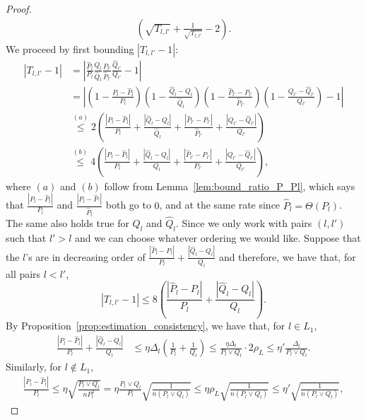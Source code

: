 \documentclass{article}
\begin{document}
\begin{proof}
\begin{align}
    \left( \sqrt{T_{l,l'}} + \frac{1}{\sqrt{T_{l,l'}}} - 2 \right). \label{eqn:Ihat_Istar2}
\end{align}
We proceed by first bounding $|T_{l,l'} - 1|$:
\begin{align*}
|T_{l,l'} - 1| &= \left| \frac{\hat{P}_l}{P_l} \frac{Q_l}{\hat{Q}_l} 
      \frac{P_{l'}}{\hat{P}_{l'}} \frac{\hat{Q}_{l'}}{Q_{l'}} - 1 \right| \\
 &= \left| \left( 1 - \frac{P_l - \hat{P}_l}{P_l} \right)
    \left( 1 - \frac{\hat{Q}_l - Q_l}{\hat{Q}_l} \right)
   \left( 1- \frac{\hat{P}_{l'} - P_{l'}}{\hat{P}_{l'}}\right)
   \left( 1 -  \frac{Q_{l'}- \hat{Q}_{l'}}{Q_{l'}} \right) -1 \right| \\
&\stackrel{(a)} \leq 2\left( \frac{|P_l - \hat{P}_l|}{P_l} +  \frac{|\hat{Q}_l - Q_l|}{\hat{Q}_l}
           +   \frac{| \hat{P}_{l'} - P_{l'}|}{\hat{P}_{l'}} +
               \frac{| Q_{l'} - \hat{Q}_{l'} | }{Q_{l'}} \right) \\
&\stackrel{(b)} \leq 4\left( \frac{|P_l - \hat{P}_l|}{P_l} +  \frac{|\hat{Q}_l - Q_l|}{Q_l}
           +   \frac{| \hat{P}_{l'} - P_{l'}|}{P_{l'}} +
               \frac{| Q_{l'} - \hat{Q}_{l'} | }{Q_{l'}} \right), 
\end{align*}
where $(a)$ and $(b)$ follow from Lemma~\ref{lem:bound_ratio_P_Pl}, which says that $\frac{|P_l - \hat P_{l}|}{P_l}$ and $\frac{|P_l - \hat P_{'}|}{\hat P_{l}}$ both go to $0$, and at the same rate since $\hat P_l = \Theta(P_l)$. The same also holds true for $Q_l$ and $\hat Q_l$. Since we only work with pairs $(l, l')$ such that $l' > l$ and we can choose whatever ordering we would like. Suppose that the $l$'s are in decreasing order of $\frac{|\hat{P}_l - P_l|}{P_l} + \frac{|\hat{Q}_l - Q_l|}{Q_l}$ and therefore, we have that, for all pairs $l < l'$, 
\[
| T_{l,l'} - 1 | \leq 8
    \left( \frac{|\hat{P}_l - P_l|}{P_l} + \frac{|\hat{Q}_l - Q_l|}{Q_l} \right).
\]
By Proposition~\ref{prop:estimation_consistency}, we have that, for $l \in L_1$,
\begin{align*}
\frac{|P_l - \hat{P}_l|}{P_l} + \frac{|\hat{Q}_l - Q_l|}{Q_l} &\leq \eta \Delta_l \left(\frac{1}{P_l} + \frac{1}{Q_l}\right)
\leq \frac{\eta \Delta_l}{P_l \vee Q_l} \cdot 2\rho_L
\leq \eta' \frac{\Delta_l}{P_l \vee Q_l}.
\end{align*}
Similarly, for $l \notin L_1$, 
\begin{align*}
\frac{|P_l - \hat{P}_l|}{P_l} \leq \eta \sqrt{\frac{P_l \vee Q_l}{n P_l^2}} = \eta \frac{P_l \vee Q_l}{P_l} \sqrt{\frac{1}{n(P_l \vee Q_l)}} \leq \eta \rho_L \sqrt{\frac{1}{n(P_l \vee Q_l)}} \leq \eta' \sqrt{\frac{1}{n(P_l \vee Q_l)}},

\end{align*}
\end{proof}
\end{document}

